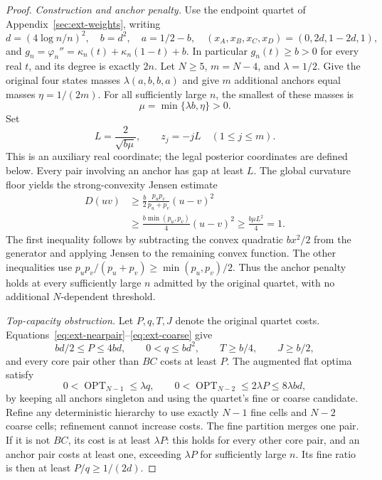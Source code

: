 \begin{proof}
\par\medskip\noindent\textit{Construction and anchor penalty.} 
Use the endpoint quartet of Appendix~\ref{sec:ext-weights}, writing
\[
 d=(4\log n/n)^2,\quad b=d^2,\quad a=1/2-b,
 \quad (x_A,x_B,x_C,x_D)=(0,2d,1-2d,1),
\]
and $g_n=\varphi_n''=\kappa_n(t)+\kappa_n(1-t)+b$.
In particular $g_n(t)\ge b>0$ for every real $t$, and its degree is
exactly $2n$.
Let $N\ge5$, $m=N-4$, and $\lambda=1/2$. Give the original four
states masses $\lambda(a,b,b,a)$ and give $m$ additional anchors equal
masses $\eta=1/(2m)$. For all sufficiently large $n$, the smallest
of these masses is
\[
 \mu=\min\{\lambda b,\eta\}>0.
\]
Set
\[
 L=\frac2{\sqrt{b\mu}},\qquad
 z_j=-jL\quad(1\le j\le m).
\]
This is an auxiliary real coordinate; the legal posterior coordinates
are defined below. Every pair involving an anchor has gap at least $L$.
The global curvature floor yields the strong-convexity Jensen estimate
\begin{align*}
 D(uv)
 &\ge\frac b2\frac{p_up_v}{p_u+p_v}(u-v)^2\\
 &\ge\frac{b\min(p_u,p_v)}4(u-v)^2
 \ge\frac{b\mu L^2}4=1.
\end{align*}
The first inequality follows by subtracting the convex quadratic
$bx^2/2$ from the generator and applying Jensen to the remaining
convex function. The other inequalities use
$p_up_v/(p_u+p_v)\ge\min(p_u,p_v)/2$.
Thus the anchor penalty holds at every sufficiently large $n$ admitted
by the original quartet, with no additional $N$-dependent threshold.

\par\medskip\noindent\textit{Top-capacity obstruction.} 
Let $P,q,T,J$ denote the original quartet costs. Equations~\eqref{eq:ext-nearpair}--\eqref{eq:ext-coarse} give
\[
 bd/2\le P\le4bd,\qquad0<q\le bd^2,
 \qquad T\ge b/4,\qquad J\ge b/2,
\]
and every core pair other than $BC$ costs at least $P$.
The augmented flat optima satisfy
\[
 0<\operatorname{OPT}_{N-1}\le\lambda q,
 \qquad0<\operatorname{OPT}_{N-2}\le2\lambda P\le8\lambda bd,
\]
by keeping all anchors singleton and using the quartet's fine or coarse
candidate. Refine any deterministic hierarchy to use exactly $N-1$
fine cells and $N-2$ coarse cells; refinement cannot increase costs.
The fine partition merges one pair. If it is not $BC$, its cost is at
least $\lambda P$: this holds for every other core pair, and an
anchor pair costs at least one, exceeding $\lambda P$ for sufficiently
large $n$. Its fine ratio is then at least $P/q\ge1/(2d)$.


\end{proof}
